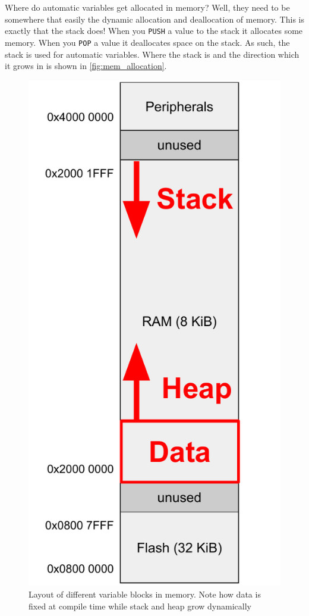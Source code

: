Where do automatic variables get allocated in memory? Well, they need to be somewhere that easily the dynamic allocation and deallocation of memory. This is exactly that the stack does! When you \texttt{PUSH} a value to the stack it allocates some memory. When you \texttt{POP} a value it deallocates space on the stack. As such, the stack is used for automatic variables. Where the stack is and the direction which it grows in is shown in \autoref{fig:mem_allocation}.

\begin{figure}
    \centering
    \includegraphics[scale=0.7]{./week8/mem_allocation.pdf}
    \caption{Layout of different variable blocks in memory. Note how data is fixed at compile time while stack and heap grow dynamically}
    \label{fig:mem_allocation}
\end{figure}

